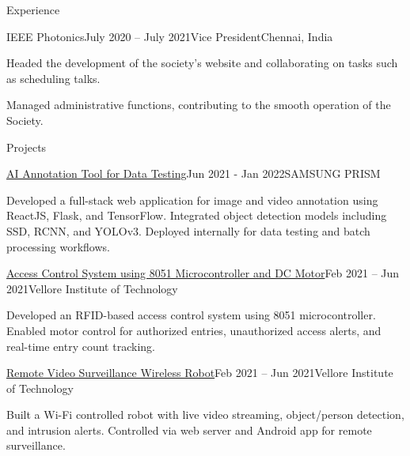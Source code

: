 \documentclass{resume}
\begin{document}
\begin{rSection}{Experience}
\begin{rSubsection}{IEEE Photonics}{July 2020 – July 2021}{Vice President}{Chennai, India}
    \item Headed the development of the society's website and collaborating on tasks such as scheduling talks. 
    \item Managed administrative functions, contributing to the smooth operation of the Society.
\end{rSubsection}

\end{rSection}



\begin{rSection}{Projects}



\begin{rSubsectionNoBullet}{\href{https://docs.google.com/document/d/1O1YsuZPpMzv1nlXXJV094MKD4nJhtZU2g33nz0zF3LI/edit}{AI Annotation Tool for Data Testing}}{Jun 2021 - Jan 2022}{SAMSUNG PRISM} {}
    \item{Developed a full-stack web application for image and video annotation using ReactJS, Flask, and TensorFlow. Integrated object detection models including SSD, RCNN, and YOLOv3. Deployed internally for data testing and batch processing workflows.}
    
\end{rSubsectionNoBullet}


\begin{rSubsectionNoBullet}{\href{https://github.com/souranild/8051sec}{Access Control System using 8051 Microcontroller and DC Motor}}{Feb 2021 – Jun 2021}{Vellore Institute of Technology}{} 
    \item{Developed an RFID-based access control system using 8051 microcontroller. Enabled motor control for authorized entries, unauthorized access alerts, and real-time entry count tracking.}
\end{rSubsectionNoBullet}

\begin{rSubsectionNoBullet}{\href{https://docs.google.com/document/d/1T75HzlptJYIZZojti-dx1BhP0im88-l5l7B-8dgqOQI/edit?usp=sharing}{Remote Video Surveillance Wireless Robot}}{Feb 2021 – Jun 2021}{Vellore Institute of Technology}{} 
    \item {Built a Wi-Fi controlled robot with live video streaming, object/person detection, and intrusion alerts. Controlled via web server and Android app for remote surveillance.}
\end{rSubsectionNoBullet}


\end{rSection}
\end{document}
